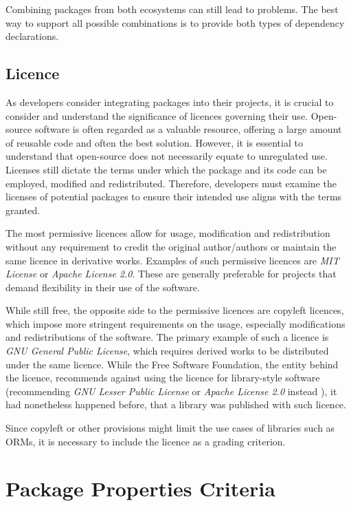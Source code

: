 Combining packages from both ecosystems can still lead to problems. The best way
to support all possible combinations is to provide both types of dependency
declarations.

\subsection{Licence}
As developers consider integrating packages into their projects, it is crucial
to consider and understand the significance of licences governing their use.
Open-source software is often regarded as a valuable resource, offering a large
amount of reusable code and often the best solution. However, it is essential to
understand that open-source does not necessarily equate to unregulated use.
Licenses still dictate the terms under which the package and its code can be
employed, modified and redistributed. Therefore, developers must examine the
licenses of potential packages to ensure their intended use aligns with the
terms granted.

The most permissive licences allow for usage, modification and redistribution
without any requirement to credit the original author/authors or maintain the
same licence in derivative works. Examples of such permissive licences are
\textit{MIT License} or \textit{Apache License 2.0}. These are generally
preferable for projects that demand flexibility in their use of the software.

While still free, the opposite side to the permissive licences are copyleft
licences, which impose more stringent requirements on the usage, especially
modifications and redistributions of the software. The primary example of such a
licence is \textit{GNU General Public License}, which requires derived works to
be distributed under the same licence. While the Free Software Foundation, the
entity behind the licence, recommends against using the licence for
library-style software (recommending \textit{GNU Lesser Public License} or
\textit{Apache License 2.0} instead ), it had nonetheless
happened before, that a library was published with such licence.

Since copyleft or other provisions might limit the use cases of libraries such
as ORMs, it is necessary to include the licence as a grading criterion.

\section{Package Properties Criteria}

